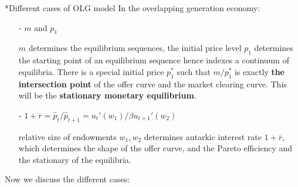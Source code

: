 \documentclass[10pt,landscape,a4paper]{article}
\makeatletter
\let\bar\overline
\renewcommand{\subsection}{\@startsection{subsection}{1}{0mm}{.2ex}{.2ex}{\small\bfseries}}
\makeatother
\begin{document}
\begin{multicols*}{3}
\vspace{4pt}
\subsection*{Different cases of OLG model}
In the overlapping generation economy:
\begin{itemize}
    \item[-] $m$ and $p_1$
    
    $m$ determines the equilibrium sequences, the initial price level $p_1$ determines the starting point of an equilibrium sequence hence indexes a continuum of equilibria. There is a special initial price $p^*_1$ such that $m/p^*_1$ is exactly \textbf{the intersection point} of the offer curve and the market clearing curve. This will be the \textbf{stationary monetary equilibrium}.
    
    \item[-] $1+\bar{r}=\hat{p}_t/\hat{p}_{t+1}=u_t'(w_1)/\beta u_{t+1}'(w_2)$
    
    relative size of endowments $w_1,w_2$ determines autarkic interest rate $1+\bar{r}$, which determines the shape of the offer curve, and the Pareto efficiency and the stationary of the equilibria.
\end{itemize}
Now we discuss the different cases:

\vspace{2pt}


\end{multicols*}
\end{document}
